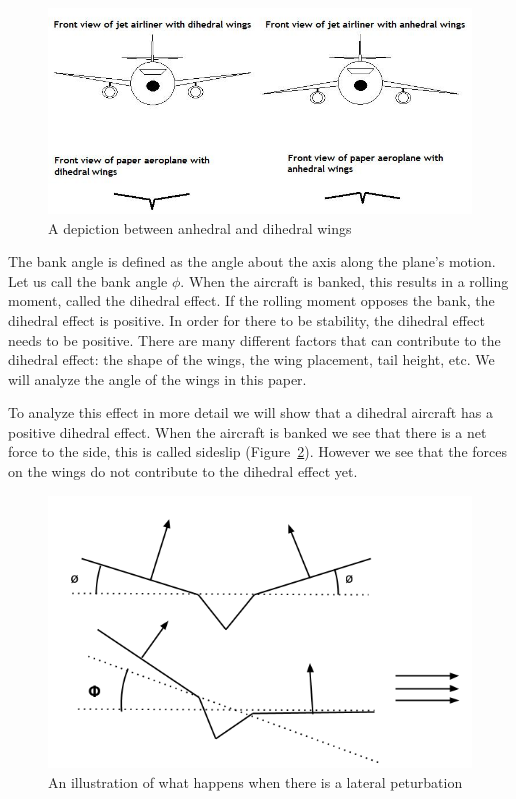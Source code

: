 \begin{figure}[hl]
  \centering
    \includegraphics[scale=.5]{figures/dihedraleffect.png}
    \caption{A depiction between anhedral and dihedral wings}
  \label{fig:dihedraleffect}
\end{figure}

The bank angle is defined as the angle about the axis along
the plane's motion. Let us call the bank angle $\phi$. When the aircraft is
banked, this results in a rolling moment, called the dihedral effect. If the
rolling moment opposes the bank, the dihedral effect is positive. In order for
there to be stability, the dihedral effect needs to be positive. There are many
different factors that can contribute to the dihedral effect: the shape of the wings,
the wing placement, tail height, etc. We will analyze the angle of the wings in this paper.

To analyze this effect in more detail we will show that a dihedral aircraft has 
a positive dihedral effect. When the aircraft is banked we see that there is a net force
to the side, this is called sideslip (Figure~\ref{fig:dihedral1}). 
However we see that the forces on the wings do not 
contribute to the dihedral effect yet.


\begin{figure}[hl]
  \centering
    \includegraphics[scale=.5]{figures/dihedral1.png}
    \caption{An illustration of what happens when there is a lateral peturbation}
  \label{fig:dihedral1}
\end{figure}

